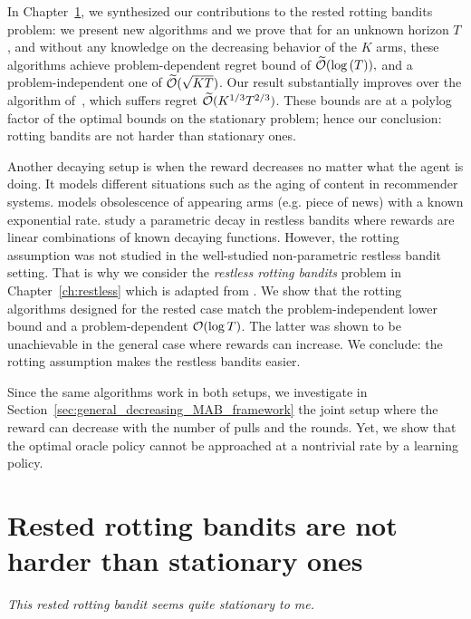 In Chapter~\ref{ch:rested}, we synthesized our contributions to the rested rotting bandits problem\citep{seznec2019rotting, seznec2020single}: we present new algorithms and we prove that for an unknown horizon $T$, and without any knowledge on the decreasing behavior of the $K$ arms, these algorithms achieve problem-dependent regret bound of $\widetilde{\mathcal{O}}(\log{(T)}),$ and a problem-independent one of $\widetilde{\mathcal{O}}(\sqrt{KT})$. Our result substantially improves over the algorithm of~\citet{levine2017rotting}, which suffers regret $\widetilde{\mathcal{O}}(K^{1/3}T^{2/3})$. These bounds are at a polylog factor of the optimal bounds on the stationary problem; hence our conclusion: rotting bandits are not harder than stationary ones. 

Another decaying setup is when the reward decreases no matter what the agent is doing. It models different situations such as the aging of content in recommender systems. \citet{louedec2016algorithme} models obsolescence of appearing arms (e.g. piece of news) with a known exponential rate. \cite{komiyama2014time-decaying} study a parametric decay in restless bandits where rewards are linear combinations of known decaying functions. However, the rotting assumption was not studied in the well-studied non-parametric restless bandit setting\citep{garivier2011upper-confidence-bound, auer2019adaptively,chen2019new, cheung2019new, russac2019weighted, besson2019generalized, liu2018change-detection, cao2019nearly, besbes2014stochastic}. That is why we consider the  \emph{restless rotting bandits} problem in Chapter~\ref{ch:restless} which is adapted from \citet{seznec2020single}.  We show that the rotting algorithms designed for the rested case match the problem-independent lower bound and a problem-dependent $\mathcal{O}(\log{T})$. The latter was shown to be unachievable in the general case where rewards can increase. We conclude: the rotting assumption makes the restless bandits easier. 

Since the same algorithms work in both setups, we investigate in Section~\ref{sec:general_decreasing_MAB_framework} the joint setup where the reward can decrease with the number of pulls and the rounds. Yet, we show that the optimal oracle policy cannot be approached at a nontrivial rate by a learning policy.

\chapter{Rested rotting bandits are not harder than stationary ones}
\label{ch:rested}
\vspace{-3cm}
\begin{flushright}
\emph{This rested rotting bandit seems quite stationary to me.}
\end{flushright}
\vspace{.85cm}







